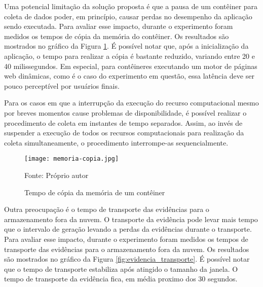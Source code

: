 %
%
%

Uma potencial limitação da solução proposta é que a pausa de um contêiner para coleta de dados poder, em princípio, causar perdas no desempenho da aplicação sendo executada. 
%
Para avaliar esse impacto, durante o experimento foram medidos os tempos de cópia da memória do contêiner.
%
Os resultados são mostrados no gráfico da Figura \ref{fig:memoria-copia}.
%
É possível notar que, após a inicialização da aplicação, o tempo para realizar a cópia é bastante reduzido, variando entre 20 e 40 milissegundos. 
%
Em especial, para contêineres executando um motor de páginas web dinâmicas, como é o caso do experimento em questão, essa latência deve ser pouco perceptível por usuários finais.


Para os casos em que a interrupção da execução do recurso computacional mesmo por breves momentos cause problemas de disponibilidade, é possível realizar o procedimento de coleta em instantes de tempo separados.
%
Assim, ao invés de suspender a execução de todos os recursos computacionais para realização da coleta simultaneamente, o procedimento interrompe-as sequencialmente.

\begin{figure}[htb!]
\footnotesize
\caption{Tempo de cópia da memória de um contêiner}
\texttt{[image: memoria-copia.jpg]}
\centering
\label{fig:memoria-copia}
\begin{center}
Fonte: Próprio autor 
\end{center}
\end{figure}


Outra preocupação é o tempo de transporte das evidências para o armazenamento fora da nuvem.
%
O transporte da evidência pode levar mais tempo que o intervalo de geração levando a perdas da evidências durante o transporte. 
%
Para avaliar esse impacto, durante o experimento foram medidos os tempos de transporte das evidências para o armazenamento fora da nuvem.
%
Os resultados são mostrados no gráfico da Figura \ref{fig:evidencia_transporte}.
%
É possível notar que o tempo de transporte estabiliza após atingido o tamanho da janela. O tempo de transporte da evidência fica, em média proximo dos 30 segundos. 

